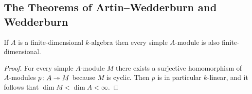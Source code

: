 







\subsection*{The Theorems of Artin--Wedderburn and Wedderburn}


\begin{lemma}
  \label{lemma: simple modules over fd algebras are fd}
  If $A$ is a finite-dimensional $k$-algebra then every simple $A$-module is also finite-dimensional.
\end{lemma}


\begin{proof}
  For every simple $A$-module $M$ there exists a surjective homomorphism of $A$-modules $p \colon A \twoheadrightarrow M$ because $M$ is cyclic.
  Then $p$ is in particular $k$-linear, and it follows that $\dim M < \dim A < \infty$.
\end{proof}



